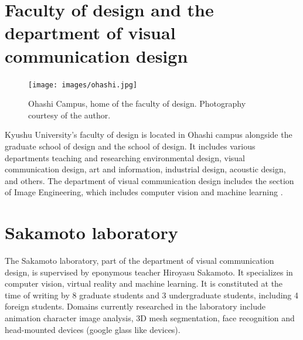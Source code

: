 \section{Faculty of design and the department of visual communication design}
\begin{figure}[htb!]
\texttt{[image: images/ohashi.jpg]}
\caption{Ohashi Campus, home of the faculty of design. Photography courtesy of the author.}
\label{fig:ohashi}
\end{figure}
Kyushu University's faculty of design is located in Ohashi campus alongside the graduate school of design and the school of design. It includes various departments teaching and researching environmental design, visual communication design, art and information, industrial design, acoustic design, and others. The department of visual communication design includes the section of Image Engineering, which includes computer vision and machine learning \cite{facultyDesignWebsite}.

\section{Sakamoto laboratory}
The Sakamoto laboratory, part of the department of visual communication design, is supervised by eponymous teacher Hiroyasu Sakamoto. It specializes in computer vision, virtual reality and machine learning. It is constituted at the time of writing by 8 graduate students and 3 undergraduate students, including 4 foreign students. Domains currently researched in the laboratory include animation character image analysis, 3D mesh segmentation, face recognition and head-mounted devices (google glass like devices).
